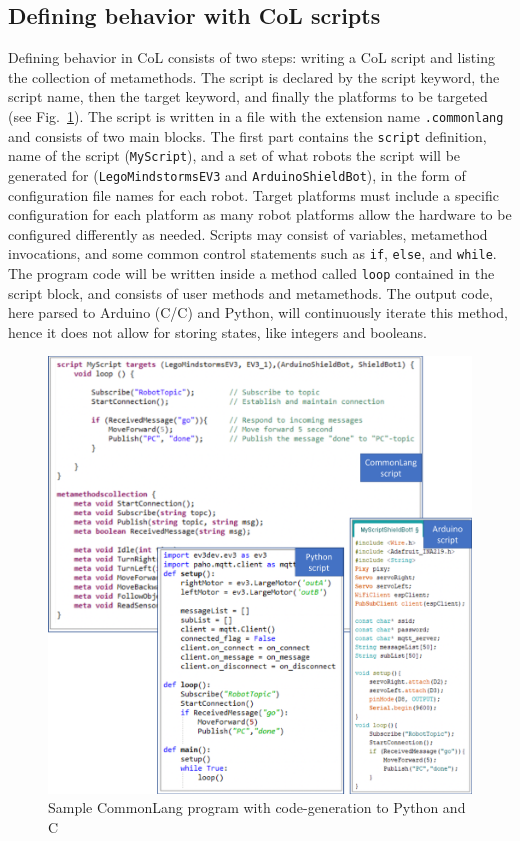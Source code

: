 \documentclass[runningheads]{llncs}
\newcommand{\cpp}{C\nolinebreak\hspace{-.05em}\raisebox{.4ex}{\tiny\bf +}\nolinebreak\hspace{-.10em}\raisebox{.4ex}{\tiny\bf +}}
\begin{document}
\subsection{Defining behavior with CoL scripts}



Defining behavior in CoL consists of two steps: writing a CoL script and listing the collection of metamethods. 
The script is declared by the script keyword, the script name, then the target keyword, and finally the platforms to be targeted (see Fig.~\ref{fig:commonlang-script}).
The script is written in a file with the extension name \texttt{.commonlang} and consists of two main blocks. 
The first part contains the \texttt{script} definition, name of the script (\texttt{MyScript}), and a set of what robots the script will be generated for (\texttt{LegoMindstormsEV3} and \texttt{ArduinoShieldBot}), in the form of configuration file names for each robot.
Target platforms must include a specific configuration for each platform as many robot platforms allow the hardware to be configured differently as needed. 
Scripts may consist of variables, metamethod invocations, and some common control statements such as \texttt{if}, \texttt{else}, and \texttt{while}.
The program code will be written inside a method called \texttt{loop} contained in the script block, and consists of user methods and metamethods. 
The output code, here parsed to Arduino (C/\cpp) and Python, will continuously iterate this method, hence it does not allow for storing states, like integers and booleans. 

\begin{figure}[t]
	\centering
	\includegraphics[width=\linewidth]{images/commonlang-short.png}
	\caption{Sample CommonLang program with code-generation to Python and C}
	\label{fig:commonlang-script}
    \vspace{-6mm}
\end{figure}
\end{document}
